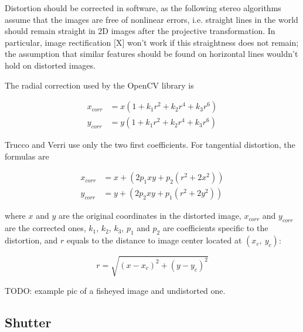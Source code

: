 


Distortion should be corrected in software, as the following stereo algorithms assume that the images are free of nonlinear errors, i.e. straight lines in the world should remain straight in 2D images after the projective transformation.
In particular, image rectification [X] won't work if this straightness does not remain; the assumption that similar features should be found on horizontal lines wouldn't hold on distorted images.

The radial correction used by the OpenCV library is

\begin{align}
	x_{corr} &= x(1 + k_1 r^2 + k_2 r^4 + k_3 r^6)\\
	y_{corr} &= y(1 + k_1 r^2 + k_2 r^4 + k_3 r^6)
\end{align}

Trucco and Verri \cite{trucco1998introductory} use only the two first coefficients. For tangential distortion, the formulas are

\begin{align}
x_{corr} &= x + (2 p_1 x y + p_2 (r^2 + 2 x^2))\\
y_{corr} &= y + (2 p_2 x y + p_1 (r^2 + 2 y^2))
\end{align}

where $x$ and $y$ are the original coordinates in the distorted image, $x_{corr}$ and $y_{corr}$ are the corrected ones, $k_1$, $k_2$, $k_3$, $p_1$ and $p_2$ are coefficients specific to the distortion, and $r$ equals to the distance to image center located at $(x_c,~y_c)$:

\begin{equation}
r = \sqrt{(x - x_c)^2 + (y - y_c)^2}
\end{equation}

TODO: example pic of a fisheyed image and undistorted one.

\subsection{Shutter}

